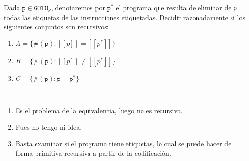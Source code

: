 \documentclass[twoside]{article}
\begin{document}
\begin{ejercicio}{12}
Dado $\texttt{p} \in \texttt{GOTO}_\texttt{P}$, denotaremos por $\texttt{p}^*$ el programa que resulta de eliminar de \texttt{p} todas
las etiquetas de las instrucciones etiquetadas. Decidir razonadamente si los siguientes conjuntos
son recursivos:
\begin{enumerate}
\item $A = \{\#(\texttt{p}) : [\![p]\!] = [\![p^*]\!]\}$
\item  $B = \{\#(\texttt{p}) : [\![p]\!] \neq [\![p^*]\!]\}$
\item $C = \{\#(\texttt{p}) : \texttt{p} = \texttt{p}^*\}$
\end{enumerate}
\end{ejercicio}
\begin{solucion}\
\begin{enumerate}
\item Es el problema de la equivalencia, luego no es recursivo. 
\item Pues no tengo ni idea.
\item Basta examinar si el programa tiene etiquetas, lo cual se puede hacer de forma primitiva recursiva a partir de la codificación.
\end{enumerate}
\end{solucion}

\newpage
\end{document}
